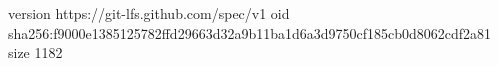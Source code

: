 version https://git-lfs.github.com/spec/v1
oid sha256:f9000e1385125782ffd29663d32a9b11ba1d6a3d9750cf185cb0d8062cdf2a81
size 1182
